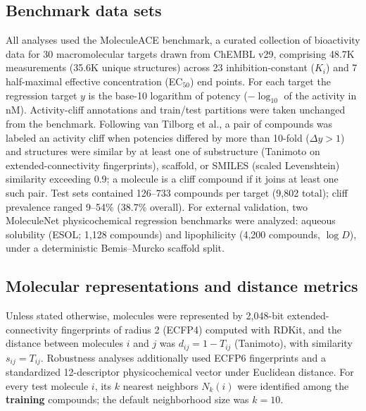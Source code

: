 \documentclass[11pt,letterpaper]{article}
\begin{document}
\subsection*{Benchmark data sets}
All analyses used the MoleculeACE benchmark,\cite{vantilborg2022} a curated collection of bioactivity data for 30 macromolecular targets drawn from ChEMBL v29,\cite{gaulton2012} comprising 48.7K measurements (35.6K unique structures) across 23 inhibition-constant ($K_i$) and 7 half-maximal effective concentration (EC$_{50}$) end points. For each target the regression target $y$ is the base-10 logarithm of potency ($-\log_{10}$ of the activity in nM). Activity-cliff annotations and train/test partitions were taken unchanged from the benchmark. Following van Tilborg et al.,\cite{vantilborg2022} a pair of compounds was labeled an activity cliff when potencies differed by more than 10-fold ($\Delta y > 1$) and structures were similar by at least one of substructure (Tanimoto on extended-connectivity fingerprints), scaffold, or SMILES (scaled Levenshtein) similarity exceeding 0.9; a molecule is a cliff compound if it joins at least one such pair. Test sets contained 126--733 compounds per target (9{,}802 total); cliff prevalence ranged 9--54\% (38.7\% overall). For external validation, two MoleculeNet physicochemical regression benchmarks were analyzed: aqueous solubility (ESOL; 1{,}128 compounds\cite{delaney2004}) and lipophilicity (4{,}200 compounds, $\log D$\cite{wu2018}), under a deterministic Bemis--Murcko scaffold split.\cite{bemis1996}

\subsection*{Molecular representations and distance metrics}
Unless stated otherwise, molecules were represented by 2{,}048-bit extended-connectivity fingerprints of radius 2 (ECFP4\cite{rogers2010}) computed with RDKit, and the distance between molecules $i$ and $j$ was $d_{ij} = 1 - T_{ij}$ (Tanimoto), with similarity $s_{ij} = T_{ij}$. Robustness analyses additionally used ECFP6 fingerprints and a standardized 12-descriptor physicochemical vector under Euclidean distance. For every test molecule $i$, its $k$ nearest neighbors $N_k(i)$ were identified among the \textbf{training} compounds; the default neighborhood size was $k = 10$.
\end{document}
